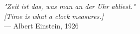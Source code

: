 \begin{flushright}
\emph{"Zeit ist das, was man an der Uhr abliest."}\\
\emph{[Time is what a clock measures.]}\\
— Albert Einstein, 1926
\end{flushright}
